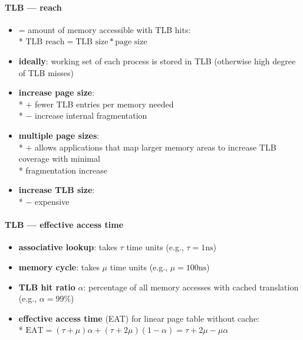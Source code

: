 \paragraph{TLB --- reach}
\begin{itemize}
  \item = amount of memory accessible with TLB hits: \\*
    $ \text{TLB reach} = \text{TLB size} * \text{page size} $
  \item \textbf{ideally}: working set of each process is stored in TLB (otherwise high degree of TLB misses)
  \item \textbf{increase page size}: \\*
    $ + $ fewer TLB entries per memory needed \\*
    $ - $ increase internal fragmentation
  \item \textbf{multiple page sizes}: \\*
    $ + $ allows applications that map larger memory areas to increase TLB coverage with minimal \\* \phantom{$ + $} fragmentation increase
  \item \textbf{increase TLB size}: \\*
    $ - $ expensive
\end{itemize}

\paragraph{TLB --- effective access time}
\begin{itemize}
  \item \textbf{associative lookup}: takes $ \tau $ time units (e.g., $ \tau = 1\text{ns} $)
  \item \textbf{memory cycle}: takes $ \mu $ time units (e.g., $ \mu = 100\text{ns} $)
  \item \textbf{TLB hit ratio} $ \alpha $: percentage of all memory accesses with cached translation (e.g., $ \alpha = 99\% $)
  \item \textbf{effective access time} (EAT) for linear page table without cache: \\*
    $ \text{EAT} = (\tau + \mu)\alpha + (\tau + 2\mu)(1-\alpha) = \tau + 2\mu - \mu\alpha $
\end{itemize}

